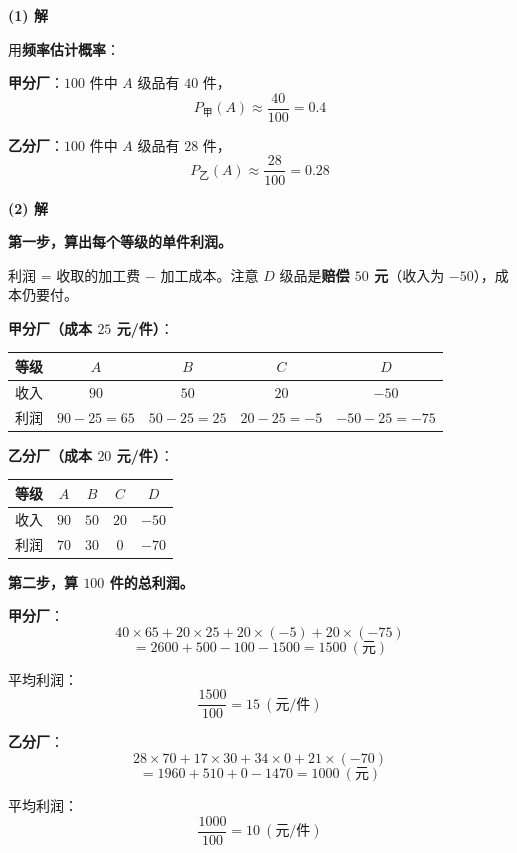 \par\medskip

\textbf{(1) 解}

用\textbf{频率估计概率}：

\textbf{甲分厂}：$100$ 件中 $A$ 级品有 $40$ 件，
\[P_{\text{甲}}(A)\approx\frac{40}{100}=0.4\]

\textbf{乙分厂}：$100$ 件中 $A$ 级品有 $28$ 件，
\[P_{\text{乙}}(A)\approx\frac{28}{100}=0.28\]

\par\medskip

\textbf{(2) 解}

\textbf{第一步，算出每个等级的单件利润。}

利润 = 收取的加工费 $-$ 加工成本。注意 $D$ 级品是\textbf{赔偿 $50$ 元}（收入为 $-50$），成本仍要付。

\textbf{甲分厂（成本 $25$ 元/件）}：

\begin{center}
\begin{tabular}{lcccc}
\toprule
等级 & $A$ & $B$ & $C$ & $D$ \\
\midrule
收入 & $90$ & $50$ & $20$ & $-50$ \\
利润 & $90-25=65$ & $50-25=25$ & $20-25=-5$ & $-50-25=-75$ \\
\bottomrule
\end{tabular}
\end{center}

\textbf{乙分厂（成本 $20$ 元/件）}：

\begin{center}
\begin{tabular}{lcccc}
\toprule
等级 & $A$ & $B$ & $C$ & $D$ \\
\midrule
收入 & $90$ & $50$ & $20$ & $-50$ \\
利润 & $70$ & $30$ & $0$ & $-70$ \\
\bottomrule
\end{tabular}
\end{center}

\textbf{第二步，算 $100$ 件的总利润。}

\textbf{甲分厂}：
\[40\times65+20\times25+20\times(-5)+20\times(-75)\]
\[=2600+500-100-1500=1500\ (\text{元})\]

平均利润：
\[\frac{1500}{100}=15\ (\text{元/件})\]

\textbf{乙分厂}：
\[28\times70+17\times30+34\times0+21\times(-70)\]
\[=1960+510+0-1470=1000\ (\text{元})\]

平均利润：
\[\frac{1000}{100}=10\ (\text{元/件})\]

